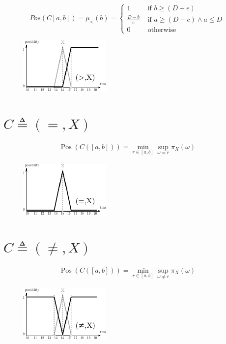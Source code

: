 \documentclass[10pt,a4paper]{article}
\newcommand{\Pos}{\operatorname{Pos}}
\begin{document}
\begin{equation}
Pos (C[a,b]) = \mu_{<}(b) =
\begin{cases}
1 & \mbox{ if } b \geq (D+e) \\
\frac{D-b}{e} & \mbox{ if } a \geq (D-c) \wedge a \leq D \\
0 & \mbox{ otherwise }
\end{cases}
\end{equation}

\begin{figure}[h]
\centering
\includegraphics[scale=1]{graphs/gt.pdf}
\end{figure}


\section*{$C\triangleq(=,X)$}
\begin{align}
\Pos (C([a,b])) = \min_{r \in [a,b]} \sup_{\omega = r} \pi_X(\omega)
\end{align}
\begin{figure}[h]
\centering
\includegraphics[scale=1]{graphs/eq.pdf}
\end{figure}

\section*{$C\triangleq(\neq,X)$}
\begin{align}
\Pos (C([a,b])) = \min_{r \in [a,b]} \sup_{\omega \neq r} \pi_X(\omega)
\end{align}
\begin{figure}[h]
\centering
\includegraphics[scale=1]{graphs/neq.pdf}
\end{figure}
\end{document}
